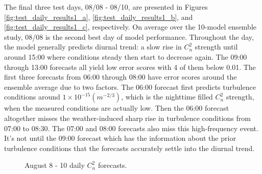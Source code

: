 The final three test days, 08/08 - 08/10, are presented in Figures \ref{fig:test_daily_results1_a}, \ref{fig:test_daily_results1_b}, and \ref{fig:test_daily_results1_c}, respectively. On average over the 10-model ensemble study, 08/08 is the second best day of model performance. Throughout the day, the model generally predicts diurnal trend: a slow rise in $C_{n}^{2}$ strength until around 15:00 where conditions steady then start to decrease again. The 09:00 through 13:00 forecasts all yield low error scores with 4 of them below 0.01. The first three forecasts from 06:00 through 08:00 have error scores around the ensemble average due to two factors. The 06:00 forecast first predicts turbulence conditions around $1 \times 10^{-15} (m^{-2/3})$, which is the nighttime filled $C_{n}^{2}$ strength, when the measured conditions are actually low. Then the 06:00 forecast altogether misses the weather-induced sharp rise in turbulence conditions from 07:00 to 08:30. The 07:00 and 08:00 forecasts also miss this high-frequency event. It's not until the 09:00 forecast which has the information about the prior turbulence conditions that the forecasts accurately settle into the diurnal trend.
\begin{figure}[h!]
	\centering
	\hfill
	\hfill
	\caption{August 8 - 10 daily $C_{n}^{2}$ forecasts.}
	\label{fig:test_daily_results1}
\end{figure}

